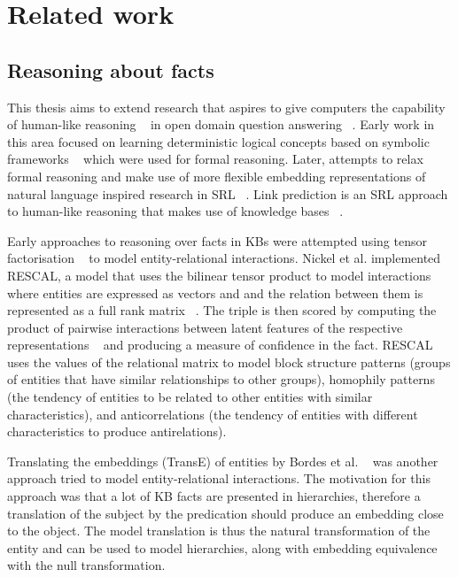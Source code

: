 \section{Related work} %

\subsection{Reasoning about facts} 

\noindent This thesis aims to extend research that aspires to give computers the capability of human-like reasoning \unskip~\citep{bordes2011learning} in open domain question answering \unskip~\citep{hakimov2019evaluating}. Early work in this area focused on learning deterministic logical concepts based on symbolic frameworks \unskip~\citep{hohenecker2017deep} which were used for formal reasoning. Later, attempts to relax formal reasoning and make use of more flexible embedding representations of natural language inspired research in SRL \unskip~\citep{koller2007introduction}. Link prediction is an SRL approach to human-like reasoning that makes use of knowledge bases \unskip~\citep{balazevic2019hypernetwork, dettmers2018convolutional, socher2013reasoning}. \par

\noindent Early approaches to reasoning over facts in KBs were attempted using tensor factorisation \unskip~\citep{nickel2011three} to model entity-relational interactions. Nickel et al. implemented RESCAL, a model that uses the bilinear tensor product to model interactions where entities are expressed as vectors and and the relation between them is represented as a full rank matrix \unskip~\citep{nickel2012factorizing}. The triple is then scored by computing the product of pairwise interactions between latent features of the respective representations \unskip~\citep{nickel2015review} and producing a measure of confidence in the fact. RESCAL uses the values of the relational matrix to model block structure patterns (groups of entities that have similar relationships to other groups), homophily patterns (the tendency of entities to be related to other entities with similar characteristics), and anticorrelations (the tendency of entities with different characteristics to produce antirelations). \par

\noindent Translating the embeddings (TransE) of entities by Bordes et al. \unskip~\citep{bordes2013translating} was another approach tried to model entity-relational interactions. The motivation for this approach was that a lot of KB facts are presented in hierarchies, therefore a translation of the subject by the predication should produce an embedding close to the object. The model translation is thus the natural transformation of the entity and can be used to model hierarchies, along with embedding equivalence with the null transformation. \par

